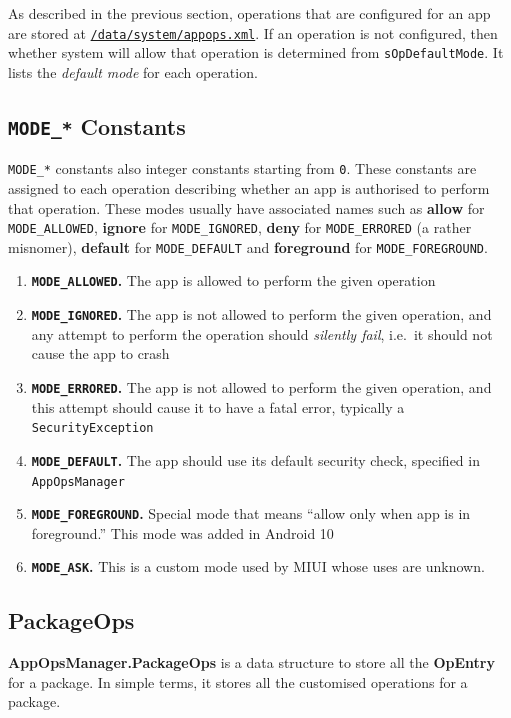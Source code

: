 As described in the previous section, operations that are configured for an app are stored at
\hyperref[sec:appops-xml]{\texttt{/data/system/appops.xml}}.
If an operation is not configured, then whether system will allow that operation is determined from \texttt{sOpDefaultMode}.
It lists the \textit{default mode} for each operation.

\subsection{\texttt{MODE\_*} Constants}\label{subsec:mode-constants}
\texttt{MODE\_*} constants also integer constants starting from \texttt{0}. These constants are assigned to each
operation describing whether an app is authorised to perform that operation. These modes usually have associated names
such as \textbf{allow} for \texttt{MODE\_ALLOWED}, \textbf{ignore} for \texttt{MODE\_IGNORED}, \textbf{deny} for
\texttt{MODE\_ERRORED} (a rather misnomer), \textbf{default} for \texttt{MODE\_DEFAULT} and \textbf{foreground}
for \texttt{MODE\_FOREGROUND}.

\begin{enumerate}\addtocounter{enumi}{-1}
    \item \textbf{\texttt{MODE\_ALLOWED}.} The app is allowed to perform the given operation
    \item \textbf{\texttt{MODE\_IGNORED}.} The app is not allowed to perform the given operation, and any attempt to
    perform the operation should \emph{silently fail}, i.e.\ it should not cause the app to crash
    \item \textbf{\texttt{MODE\_ERRORED}.} The app is not allowed to perform the given operation, and this attempt
    should cause it to have a fatal error, typically a \texttt{SecurityException}
    \item \textbf{\texttt{MODE\_DEFAULT}.} The app should use its default security check, specified in \texttt{AppOpsManager}
    \item \textbf{\texttt{MODE\_FOREGROUND}.} Special mode that means ``allow only when app is in foreground.''
    This mode was added in Android 10
    \item \textbf{\texttt{MODE\_ASK}.} This is a custom mode used by MIUI whose uses are unknown.
\end{enumerate}

\subsection{PackageOps}\label{subsec:package-ops}
\textbf{AppOpsManager.PackageOps} is a data structure to store all the \textbf{OpEntry} for a package. In simple terms,
it stores all the customised operations for a package.

